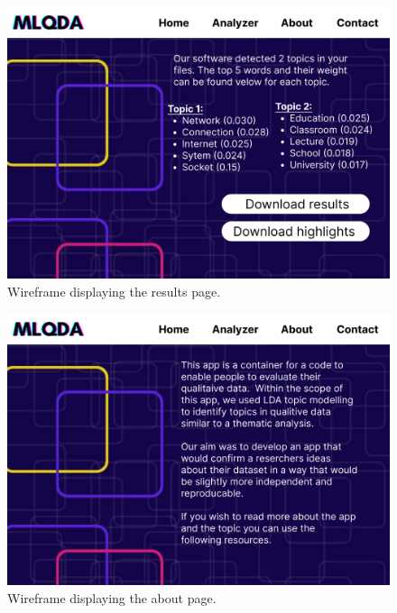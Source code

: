 \documentclass{l4proj}
\begin{document}
\begin{appendices}
\begin{figure}[H]
\centering
    \includegraphics[width=0.95\linewidth]{images/Analyzer (results).png}
    \caption{Wireframe displaying the results page.}
    \label{fig:wireframes_results} 
\end{figure}

\begin{figure}[H]
\centering
    \includegraphics[width=0.95\linewidth]{images/About.png}
    \caption{Wireframe displaying the about page.}
    \label{fig:wireframes_about} 
\end{figure}


\end{appendices}
\end{document}
